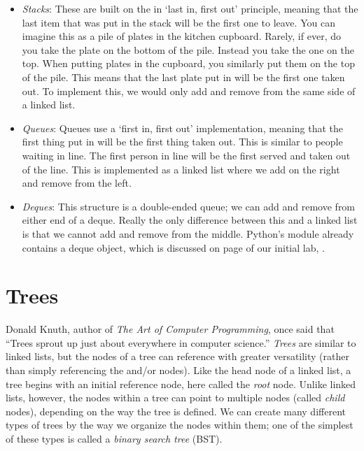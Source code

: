\begin{itemize}
\item \emph{Stacks}: These are built on the in `last in, first out' principle, meaning that the last item that was put in the stack will be the first one to leave.
You can imagine this as a pile of plates in the kitchen cupboard.
Rarely, if ever, do you take the plate on the bottom of the pile.
Instead you take the one on the top.
When putting plates in the cupboard, you similarly put them on the top of the pile.
This means that the last plate put in will be the first one taken out.
To implement this, we would only add and remove from the same side of a linked list.
\item \emph{Queues}: Queues use a `first in, first out' implementation, meaning that the first thing put in will be the first thing taken out.
This is similar to people waiting in line.
The first person in line will be the first served and taken out of the line.
This is implemented as a linked list where we add on the right and remove from the left.
\item \emph{Deques}: This structure is a double-ended queue; we can add and remove from either end of a deque.
Really the only difference between this and a linked list is that we cannot add and remove from the middle.
Python's  module already contains a deque object, which is discussed on page \pageref{deques} of our initial lab, .
\end{itemize}

\section*{Trees}
\label{Binary Search Tree}
Donald Knuth, author of \emph{The Art of Computer Programming}, once said that ``Trees sprout up just about everywhere in computer science.''
\emph{Trees} are similar to linked lists, but the nodes of a tree can reference with greater versatility (rather than simply referencing the  and/or  nodes).
Like the head node of a linked list, a tree begins with an initial reference node, here called the \emph{root} node.
Unlike linked lists, however, the nodes within a tree can point to multiple nodes (called \emph{child} nodes), depending on the way the tree is defined.
We can create many different types of trees by the way we organize the nodes within them; one of the simplest of these types is called a \emph{binary search tree} (BST).

